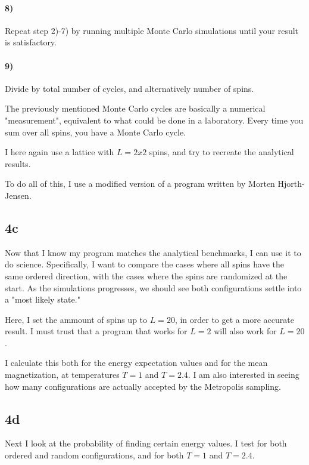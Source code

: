 \documentclass[10pt,showpacs,preprintnumbers,footinbib,amsmath,amssymb,aps,prl,twocolumn,groupedaddress,superscriptaddress,showkeys]{revtex4-1}
\begin{document}
\paragraph{8)} Repeat step 2)-7) by running multiple Monte Carlo simulations until your result is satisfactory.

\paragraph{9)} Divide by total number of cycles, and alternatively number of spins.

The previously mentioned Monte Carlo cycles are basically a numerical "measurement", equivalent to what could be done in a laboratory. Every time you sum over all spins, you have a Monte Carlo cycle.

I here again use a lattice with $L = 2x2$ spins, and try to recreate the analytical results.


To do all of this, I use a modified version of a program written by Morten Hjorth-Jensen.



\subsection*{4c}

Now that I know my program matches the analytical benchmarks, I can use it to do science. Specifically, I want to compare the cases where all spins have the same ordered direction, with the cases where the spins are randomized at the start. As the simulations progresses, we should see both configurations settle into a "most likely state."

Here, I set the ammount of spins up to $L = 20$, in order to get a more accurate result. I must trust that a program that works for $L = 2$ will also work for $L = 20$.

I calculate this both for the energy expectation values and for the mean magnetization, at temperatures $T = 1$ and $T = 2.4$. I am also interested in seeing how many configurations are actually accepted by the Metropolis sampling.



\subsection*{4d}

Next I look at the probability of finding certain energy values. I test for both ordered and random configurations, and for both $T = 1$ and $T = 2.4$.
\end{document}
